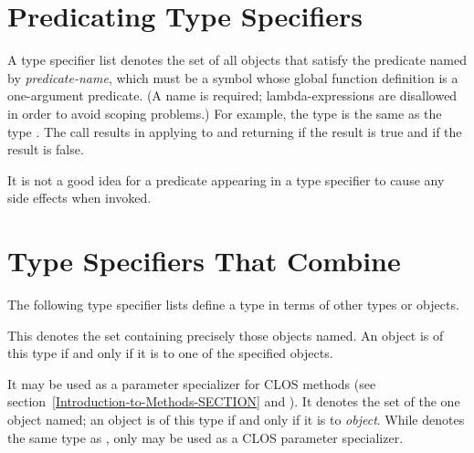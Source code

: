 \section{Predicating Type Specifiers}
\label{PREDICATING-TYPE-SPECIFIERS-SECTION}

A type specifier list  denotes
the set of all objects that satisfy the predicate named by \emph{predicate-name},
which must be a symbol whose global function definition is a one-argument
predicate.
(A name is required; lambda-expressions are disallowed in order to avoid
scoping problems.)  For example, the type  is the
same as the type .
The call  results in applying  to 
and returning  if the result is true and {\nil} if the result is false.

It is not a good idea for
a predicate appearing in a  type specifier to
cause any side effects when invoked.

\section{Type Specifiers That Combine}

The following type specifier lists define a type in terms of
other types or objects.

\begin{flushdesc}
\item[\cd{(member \emph{object1} \emph{object2} ...)}]
This denotes the set
containing precisely those objects named.  An object is of
this type if and only if it is  to one of the specified objects.
\end{flushdesc}

\begin{flushdesc}
\item[\cd{(eql \emph{object})}]
It may be used as a parameter specializer for CLOS methods
(see section~\ref{Introduction-to-Methods-SECTION}
and ).
It denotes the set of the one object named;  an object is of
this type if and only if it is  to \emph{object}.  While
 denotes the same type as ,
only  may be used as a CLOS parameter specializer.
\end{flushdesc}

